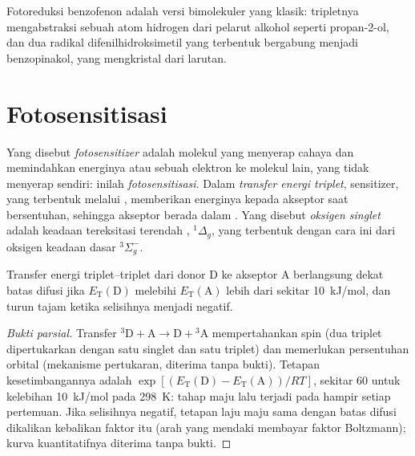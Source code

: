 Fotoreduksi benzofenon adalah versi bimolekuler yang klasik: tripletnya
mengabstraksi sebuah atom hidrogen dari pelarut alkohol seperti propan-2-ol,
dan dua radikal difenilhidroksimetil yang terbentuk bergabung menjadi
benzopinakol, yang mengkristal dari larutan.

\section{Fotosensitisasi}

\begin{definition}\label{def:b3:photochemistry:sensitisation}
Yang disebut \emph{fotosensitizer} adalah molekul yang
menyerap cahaya dan memindahkan energinya atau sebuah elektron ke molekul lain,
yang tidak menyerap sendiri: inilah \emph{fotosensitisasi}.
Dalam \emph{transfer energi triplet},  sensitizer, yang terbentuk melalui , memberikan
energinya kepada akseptor saat bersentuhan, sehingga akseptor berada dalam
. Yang disebut \emph{oksigen singlet}
adalah keadaan tereksitasi terendah , ${}^1\Delta_g$, yang terbentuk dengan
cara ini dari oksigen keadaan dasar ${}^3\Sigma_g^-$.
\end{definition}

\begin{proposition}\label{prop:b3:photochemistry:sensitisation-condition}
Transfer energi triplet--triplet dari donor D ke akseptor A berlangsung dekat
batas difusi jika $E_{\mathrm T}(\mathrm D)$ melebihi $E_{\mathrm T}(\mathrm A)$ lebih dari
sekitar \qty{10}{kJ/mol}, dan turun tajam ketika selisihnya menjadi negatif.
\end{proposition}

\begin{proof}[Bukti parsial]
Transfer ${}^3\mathrm D + \mathrm A \to \mathrm D + {}^3\mathrm A$ mempertahankan spin (dua triplet
dipertukarkan dengan satu singlet dan satu triplet) dan memerlukan
persentuhan orbital (mekanisme pertukaran, diterima tanpa bukti). Tetapan
kesetimbangannya adalah $\exp[(E_{\mathrm T}(\mathrm D) - E_{\mathrm T}(\mathrm A))/RT]$, sekitar 60 untuk
kelebihan \qty{10}{kJ/mol} pada \qty{298}{K}: tahap maju lalu terjadi pada hampir
setiap pertemuan. Jika selisihnya negatif, tetapan laju maju sama dengan batas
difusi dikalikan kebalikan faktor itu (arah yang mendaki membayar faktor
Boltzmann); kurva kuantitatifnya diterima tanpa bukti.
\end{proof}

